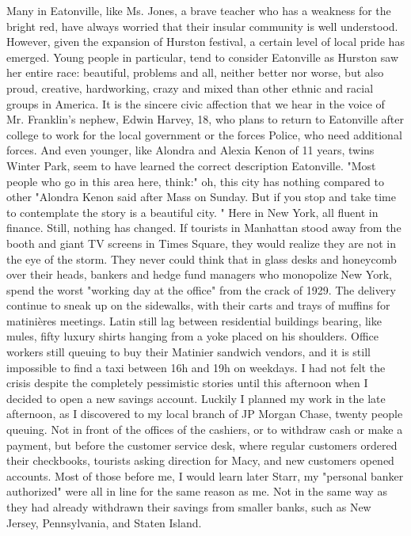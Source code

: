 Many in Eatonville, like Ms. Jones, a brave teacher who has a weakness for the bright red, have always worried that their insular community is well understood.
However, given the expansion of Hurston festival, a certain level of local pride has emerged.
Young people in particular, tend to consider Eatonville as Hurston saw her entire race: beautiful, problems and all, neither better nor worse, but also proud, creative, hardworking, crazy and mixed than other ethnic and racial groups in America.
It is the sincere civic affection that we hear in the voice of Mr. Franklin's nephew, Edwin Harvey, 18, who plans to return to Eatonville after college to work for the local government or the forces Police, who need additional forces.
And even younger, like Alondra and Alexia Kenon of 11 years, twins Winter Park, seem to have learned the correct description Eatonville.
"Most people who go in this area here, think:" oh, this city has nothing compared to other "Alondra Kenon said after Mass on Sunday.
But if you stop and take time to contemplate the story is a beautiful city. "
Here in New York, all fluent in finance.
Still, nothing has changed.
If tourists in Manhattan stood away from the booth and giant TV screens in Times Square, they would realize they are not in the eye of the storm.
They never could think that in glass desks and honeycomb over their heads, bankers and hedge fund managers who monopolize New York, spend the worst "working day at the office" from the crack of 1929.
The delivery continue to sneak up on the sidewalks, with their carts and trays of muffins for matinières meetings.
Latin still lag between residential buildings bearing, like mules, fifty luxury shirts hanging from a yoke placed on his shoulders.
Office workers still queuing to buy their Matinier sandwich vendors, and it is still impossible to find a taxi between 16h and 19h on weekdays.
I had not felt the crisis despite the completely pessimistic stories until this afternoon when I decided to open a new savings account.
Luckily I planned my work in the late afternoon, as I discovered to my local branch of JP Morgan Chase, twenty people queuing.
Not in front of the offices of the cashiers, or to withdraw cash or make a payment, but before the customer service desk, where regular customers ordered their checkbooks, tourists asking direction for Macy, and new customers opened accounts.
Most of those before me, I would learn later Starr, my "personal banker authorized" were all in line for the same reason as me.
Not in the same way as they had already withdrawn their savings from smaller banks, such as New Jersey, Pennsylvania, and Staten Island.
